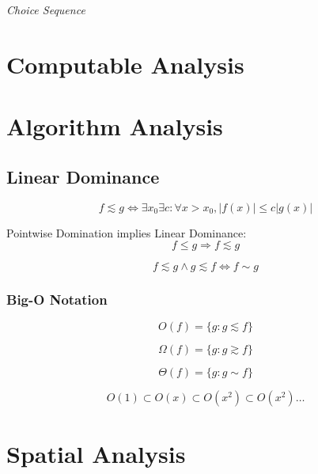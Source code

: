 \emph{Choice Sequence}



\section{Computable Analysis}\label{sec:computable_analysis}

\section{Algorithm Analysis}\label{sec:algorithm_analysis}

\subsection{Linear Dominance}\label{sec:linear_dominance}

\[
    f \lesssim g \Leftrightarrow
    \exists x_0 \exists c : \forall x > x_0, |f(x)| \leq c |g(x)|
\]

Pointwise Domination implies Linear Dominance:
\[
    f \leq g \Rightarrow f \lesssim g
\]

\[
    f \lesssim g \wedge g \lesssim f \Leftrightarrow f \sim g
\]



\subsubsection{Big-O Notation}\label{sec:bigo_notation}

\[
    O(f) = \{ g : g \lesssim f \}
\]

\[
    \Omega(f) = \{ g : g \gtrsim f \}
\]

\[
    \Theta(f) = \{ g : g \sim f \}
\]

\[
    O(1) \subset O(x) \subset O(x^2) \subset O(x^2) \ldots
\]



\section{Spatial Analysis}\label{sec:spatial_analysis}

